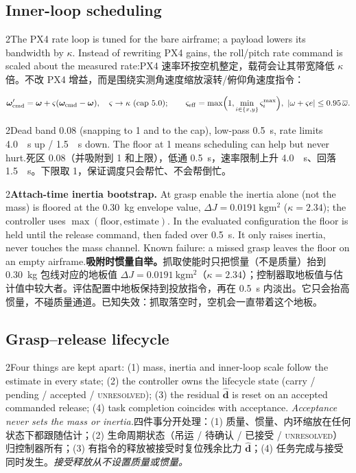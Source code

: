 \documentclass[10pt,a4paper]{article}
\numberwithin{equation}{section}
\newcommand{\dJ}{\Delta J}
\newcommand{\pair}[2]{\begin{paracol}{2}#1\switchcolumn #2\end{paracol}}
\newcommand{\bsub}[2]{\needspace{8\baselineskip}\subsection{#1\quad{\normalfont #2}}}
\begin{document}
\bsub{Inner-loop scheduling}{内环调度}
\pair{The PX4 rate loop is tuned for the bare airframe; a payload lowers its
bandwidth by $\kappa$. Instead of rewriting PX4 gains, the roll/pitch rate
command is scaled about the measured rate:}
{PX4 速率环按空机整定，载荷会让其带宽降低 $\kappa$ 倍。不改 PX4 增益，而是围绕实测角速度缩放滚转/俯仰角速度指令：}
\begin{equation}
\bm\omega'_{\mathrm{cmd}}=\bm\omega+\varsigma(\bm\omega_{\mathrm{cmd}}-\bm\omega),\quad
\varsigma\to\kappa\ (\text{cap }5.0);\qquad
\varsigma_{\mathrm{eff}}=\max\Bigl(1,\min_{i\in\{x,y\}}\varsigma_i^{\max}\Bigr),\ |\omega+\varsigma e|\le0.95\,\overline\omega .
\end{equation}
\pair{Dead band 0.08 (snapping to 1 and to the cap), low-pass
\SI{0.5}{\second}, rate limits \SI{4.0}{\per\second} up /
\SI{1.5}{\per\second} down. The floor at 1 means scheduling can help but never
hurt.}
{死区 0.08（并吸附到 1 和上限），低通 \SI{0.5}{\second}，速率限制上升 \SI{4.0}{\per\second}、回落 \SI{1.5}{\per\second}。下限取 1，保证调度只会帮忙、不会帮倒忙。}

\pair{\textbf{Attach-time inertia bootstrap.} At grasp enable the inertia
alone (not the mass) is floored at the \SI{0.30}{\kg} envelope value,
$\dJ=\SI{0.0191}{\kg\meter\squared}$ ($\kappa=2.34$); the controller uses
$\max(\text{floor},\text{estimate})$. In the evaluated configuration the floor
is held until the release command, then faded over \SI{0.5}{\second}. It only
raises inertia, never touches the mass channel. Known failure: a missed grasp
leaves the floor on an empty airframe.}
{\textbf{吸附时惯量自举。}抓取使能时只把惯量（不是质量）抬到 \SI{0.30}{\kg} 包线对应的地板值 $\dJ=\SI{0.0191}{\kg\meter\squared}$（$\kappa=2.34$）；控制器取地板值与估计值中较大者。评估配置中地板保持到投放指令，再在 \SI{0.5}{\second} 内淡出。它只会抬高惯量，不碰质量通道。已知失效：抓取落空时，空机会一直带着这个地板。}

\bsub{Grasp--release lifecycle}{抓取--释放生命周期}
\pair{Four things are kept apart: (1) mass, inertia and inner-loop scale follow
the estimate in every state; (2) the controller owns the lifecycle state
(carry / pending / accepted / \textsc{unresolved}); (3) the residual
$\hat{\bm d}$ is reset on an accepted commanded release; (4) task completion
coincides with acceptance. \emph{Acceptance never sets the mass or inertia.}}
{四件事分开处理：(1) 质量、惯量、内环缩放在任何状态下都跟随估计；(2) 生命周期状态（吊运 / 待确认 / 已接受 / \textsc{unresolved}）归控制器所有；(3) 有指令的释放被接受时复位残余比力 $\hat{\bm d}$；(4) 任务完成与接受同时发生。\emph{接受释放从不设置质量或惯量。}}
\end{document}
